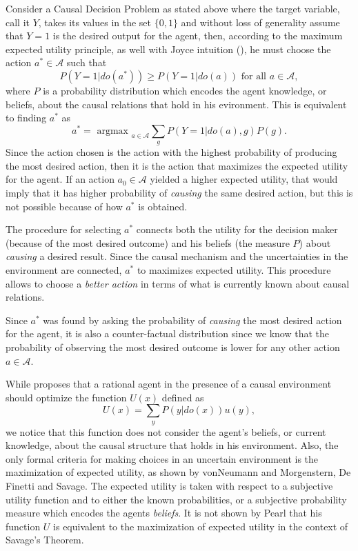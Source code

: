 \documentclass[letterpaper]{article} %
\theoremstyle{plain}
\begin{document}
Consider a Causal Decision Problem as stated above where the target variable, call it $Y$, takes its values in the set $\{0,1\}$ and without loss of generality assume that $Y=1$ is the desired output for the agent, then, according to the maximum expected utility principle, as well with Joyce intuition (\cite{joyce1999foundations}), he must choose the action $a^\ast \in \mathcal{A}$ such that
\[ P(Y=1 | do(a^\ast)) \geq P(Y=1 | do(a)) \textrm{ for all } a \in \mathcal{A}, \]
where $P$ is a probability distribution which encodes the agent knowledge, or beliefs, about the causal relations that hold in his evironment. This is equivalent to finding $a^\ast$  as
\[  a^\ast = \textrm{ argmax }_{a \in \mathcal{A}}\sum_g P(Y=1 | do(a), g)P(g). \]
Since the action chosen is the action with the highest probability of producing the most desired action, then it is the action that maximizes the expected utility for the agent. If an action $a_0 \in \mathcal{A}$ yielded a higher expected utility, that would imply that it has higher probability of \textit{causing} the same desired action, but this is not possible because of how $a^\ast$ is obtained.

The procedure for selecting $a^\ast$ connects both the utility for the decision maker (because of the most desired outcome) and his beliefs (the measure $P$) about \textit{causing} a desired result. Since the causal mechanism and the uncertainties in the environment are connected, $a^\ast$ to maximizes expected utility. This procedure allows to choose a \textit{better action} in terms of what is currently known about causal relations.

Since $a^\ast$ was found by asking the probability of \textit{causing} the most desired action for the agent, it is also a counter-factual distribution since we know that the probability of observing the most desired outcome is lower for any other action $a \in \mathcal{A}$.

While \cite{pearl2009causality} proposes that a rational agent in the presence of a causal environment should optimize the function $U(x)$ defined as 
\[ U(x)=\sum_y P(y | do(x)) u(y), \]
we notice that this function does not consider the agent's beliefs, or current knowledge, about the causal structure that holds in his environment. Also, the only formal criteria for making choices in an uncertain environment is the maximization of expected utility, as shown by vonNeumann and Morgenstern, De Finetti and Savage. The expected utility is taken with respect to a subjective utility function and to either the known probabilities, or a subjective probability measure which encodes the agents \textit{beliefs}. It is not shown by Pearl that his function $U$ is equivalent to the maximization of expected utility in the context of Savage's Theorem.
\end{document}

